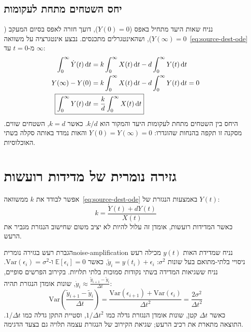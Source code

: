 \subsection{יחס השטחים מתחת לעקומות}
נניח שאות היעד מתחיל באפס ($Y(0)=0$), דועך חזרה לאפס בסיום המעקב ($Y(\infty)=0$), ושהאינטגרלים מתכנסים. נבצע אינטגרציה על משוואה~\eqref{eq:source-dest-ode} מ-$t=0$ עד $\infty$:
\begin{align}
\int_0^\infty \dot{Y}(t)\,\dd t &= k \int_0^\infty X(t)\,\dd t - d \int_0^\infty Y(t)\,\dd t \notag\\
Y(\infty) - Y(0) &= k \int_0^\infty X(t)\,\dd t - d \int_0^\infty Y(t)\,\dd t = 0 \notag\\
\Aboxed{\int_0^\infty Y(t)\,\dd t &= \frac{k}{d} \int_0^\infty X(t)\,\dd t} \label{eq:area-conservation}
\end{align}
היחס בין השטחים מתחת לעקומות היעד והמקור הוא $k/d$. כאשר $k=d$, השטחים שווים. מסקנה זו תקפה בהנחות שהוגדרו: $Y(0)=Y(\infty)=0$ והאות נמדד באותה סקלה בשתי האוכלוסיות.

\section{גזירה נומרית של מדידות רועשות}\label{sec:numerical-diff-trap}
אפשר לבודד את $k$ ממשוואה~\eqref{eq:source-dest-ode} באמצעות הנגזרת של $Y(t)$:
\begin{equation}\label{eq:naive-diff}
k = \frac{\dot{Y}(t) + d Y(t)}{X(t)}
\end{equation}
כאשר המדידות רועשות, אומדן זה עלול להיות לא יציב משום שחישוב הנגזרת מגביר את הרעש.

\begin{theorem}{הגברת רעש בגזירה נומרית}{noise-amplification}
נניח שמדידת האות $y(t)$ מכילה רעש ניסויי בלתי-מתואם בעל שונות $\sigma^2$: $\tilde{y}_i = y(t_i) + \epsilon_i$, כאשר $\mathbb{E}[\epsilon_i]=0$ ו-$\mathrm{Var}(\epsilon_i) = \sigma^2$.
נניח ששגיאות המדידה בשתי נקודות סמוכות בלתי תלויות. בקירוב הפרשים סופיים, $\dot{y}_i \approx \frac{\tilde{y}_{i+1} - \tilde{y}_i}{\Delta t}$, שונות אומדן הנגזרת תהיה:
\begin{equation}\label{eq:finite-diff-variance}
\mathrm{Var}\left(\frac{\tilde{y}_{i+1} - \tilde{y}_i}{\Delta t}\right) = \frac{\mathrm{Var}(\epsilon_{i+1}) + \mathrm{Var}(\epsilon_i)}{\Delta t^2} = \frac{2\sigma^2}{\Delta t^2}
\end{equation}
כאשר $\Delta t$ קטן, שונות אומדן הנגזרת גדלה כמו $1/\Delta t^2$, וסטיית התקן גדלה כמו $1/\Delta t$. התוצאה מתארת את רכיב הרעש; שגיאת הקירוב של הנגזרת עצמה תלויה גם בצעד הדגימה.
\end{theorem}

